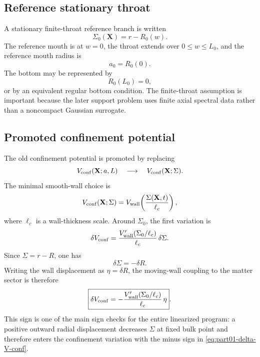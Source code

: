 \subsection{Reference stationary throat}
\label{subsec:part01-reference-throat}

A stationary finite-throat reference branch is written
\begin{equation}
\label{eq:part01-stationary-surface}
\Sigma_0(\mathbf X)=r-R_0(w).
\end{equation}
The reference mouth is at \(w=0\), the throat extends over \(0\le w\le L_0\), and the reference mouth radius is
\begin{equation}
\label{eq:part01-reference-mouth-radius}
a_0=R_0(0).
\end{equation}
The bottom may be represented by
\begin{equation}
R_0(L_0)=0,
\end{equation}
or by an equivalent regular bottom condition.  The finite-throat assumption is important because the later support problem uses finite axial spectral data rather than a noncompact Gaussian surrogate.

\subsection{Promoted confinement potential}
\label{subsec:part01-promoted-confinement}

The old confinement potential is promoted by replacing
\begin{equation}
V_{\rm conf}(\mathbf X;a,L)
\quad\longrightarrow\quad
V_{\rm conf}(\mathbf X;\Sigma).
\end{equation}
The minimal smooth-wall choice is
\begin{equation}
\label{eq:part01-promoted-wall-potential}
V_{\rm conf}(\mathbf X;\Sigma)
=
V_{\rm wall}\!\left(\frac{\Sigma(\mathbf X,t)}{\ell_c}\right),
\end{equation}
where \(\ell_c\) is a wall-thickness scale.  Around \(\Sigma_0\), the first variation is
\begin{equation}
\delta V_{\rm conf}
=
\frac{V_{\rm wall}'(\Sigma_0/\ell_c)}{\ell_c}\,\delta\Sigma.
\end{equation}
Since \(\Sigma=r-R\), one has
\begin{equation}
\label{eq:part01-delta-sigma}
\delta\Sigma=-\delta R.
\end{equation}
Writing the wall displacement as \(\eta=\delta R\), the moving-wall coupling to the matter sector is therefore
\begin{equation}
\label{eq:part01-delta-V-conf}
\boxed{
\delta V_{\rm conf}
=
-\frac{V_{\rm wall}'(\Sigma_0/\ell_c)}{\ell_c}\,\eta}.
\end{equation}
This sign is one of the main sign checks for the entire linearized program: a positive outward radial displacement decreases \(\Sigma\) at fixed bulk point and therefore enters the confinement variation with the minus sign in \eqref{eq:part01-delta-V-conf}.


